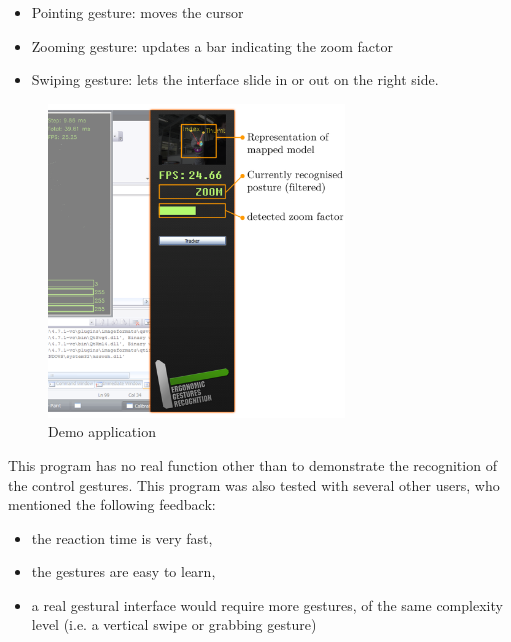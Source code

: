 \begin{itemize}
\item Pointing gesture: moves the cursor
\item Zooming gesture: updates a bar indicating the zoom factor
\item Swiping gesture: lets the interface slide in or out on the right side.
\end{itemize}

\begin{figure}[H]
\center
\includegraphics[width=0.7\textwidth]{images/demo} 
\caption{Demo application}
\label{fig:demo}
\end{figure}

This program has no real function other than to demonstrate the recognition of the control gestures. This program was also tested with several other users, who mentioned the following feedback:
\begin{itemize}
\item the reaction time is very fast,
\item the gestures are easy to learn,
\item a real gestural interface would require more gestures, of the same complexity level (i.e. a vertical swipe or grabbing gesture)
\end{itemize}  

